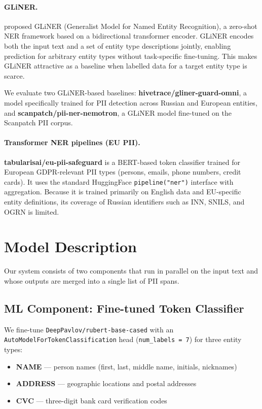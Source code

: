 \documentclass{article}
\begin{document}
\paragraph{GLiNER.}
\citet{zaratiana2024gliner} proposed GLiNER (Generalist Model for Named Entity Recognition), a zero-shot NER framework based on a bidirectional transformer encoder. GLiNER encodes both the input text and a set of entity type descriptions jointly, enabling prediction for arbitrary entity types without task-specific fine-tuning. This makes GLiNER attractive as a baseline when labelled data for a target entity type is scarce.

We evaluate two GLiNER-based baselines: \textbf{hivetrace/gliner-guard-omni}, a model specifically trained for PII detection across Russian and European entities, and \textbf{scanpatch/pii-ner-nemotron}, a GLiNER model fine-tuned on the Scanpatch PII corpus.

\paragraph{Transformer NER pipelines (EU PII).}
\textbf{tabularisai/eu-pii-safeguard} is a BERT-based token classifier trained for European GDPR-relevant PII types (persons, emails, phone numbers, credit cards). It uses the standard HuggingFace \texttt{pipeline("ner")} interface with aggregation. Because it is trained primarily on English data and EU-specific entity definitions, its coverage of Russian identifiers such as INN, SNILS, and OGRN is limited.

\section{Model Description}

Our system consists of two components that run in parallel on the input text and whose outputs are merged into a single list of PII spans.

\subsection{ML Component: Fine-tuned Token Classifier}

We fine-tune \texttt{DeepPavlov/rubert-base-cased} with an \texttt{AutoModelForTokenClassification} head (\texttt{num\_labels = 7}) for three entity types:

\begin{itemize}
    \item \textbf{NAME} --- person names (first, last, middle name, initials, nicknames)
    \item \textbf{ADDRESS} --- geographic locations and postal addresses
    \item \textbf{CVC} --- three-digit bank card verification codes
\end{itemize}
\end{document}
